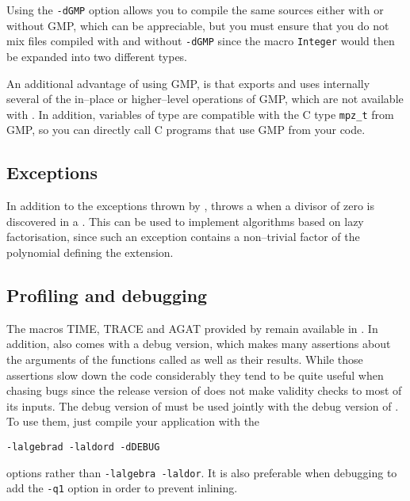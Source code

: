 Using the {\tt -dGMP} option allows you to compile the same sources
either with or without GMP, which can be appreciable, but you must
ensure that you do not mix files compiled with and without {\tt -dGMP} since
the macro {\tt Integer} would then be expanded into two different types.

An additional advantage of using GMP, is that 
exports and uses internally several of the in--place or higher--level
operations of GMP, which are not available with .
In addition, variables of type  are compatible
with the C type {\tt mpz\_t} from GMP, so you can directly call
C programs that use GMP from your \aldor{} code.

\subsection{Exceptions}
In addition to the exceptions thrown by \libaldor, \libalgebra throws a
 when a divisor of zero
is discovered in a . This can be used
to implement algorithms based on lazy factorisation, since such an
exception contains a non--trivial factor of the polynomial defining
the extension.

\subsection{Profiling and debugging}
The macros TIME, TRACE and AGAT provided by \libaldor{} remain available
in \libalgebra. In addition,
\libalgebra{} also comes with a debug version, which makes many assertions
about the arguments of the functions called as well as their results.
While those assertions slow down the code considerably they tend to
be quite useful when chasing bugs since the release version of \libalgebra{}
does not make validity checks to most of its inputs.
The debug version of \libalgebra{} must be used jointly with the debug
version of \libaldor. To use them, just compile your application with the
\begin{center}
{\tt -lalgebrad -laldord -dDEBUG}
\end{center}
options rather than {\tt -lalgebra -laldor}.
It is also preferable when debugging to add the {\tt -q1} option
in order to prevent inlining.

